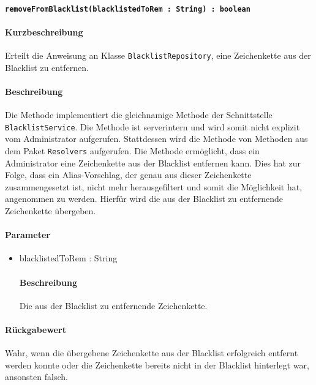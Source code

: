 \paragraph{\texttt{removeFromBlacklist(blacklistedToRem : String) : boolean}}%
\paragraph*{Kurzbeschreibung}
Erteilt die Anweisung an Klasse \texttt{BlacklistRepository}, eine Zeichenkette aus der Blacklist zu entfernen.
\paragraph*{Beschreibung}
Die Methode implementiert die gleichnamige Methode der Schnittstelle \texttt{BlacklistService}.
Die Methode ist serverintern und wird somit nicht explizit vom Administrator aufgerufen.
Stattdessen wird die Methode von Methoden aus dem Paket \texttt{Resolvers} aufgerufen.
Die Methode ermöglicht, dass ein Administrator eine Zeichenkette aus der Blacklist entfernen kann.
Dies hat zur Folge, dass ein Alias-Vorschlag, der genau aus dieser Zeichenkette zusammengesetzt ist, nicht mehr herausgefiltert und somit die Möglichkeit hat, angenommen zu werden.
Hierfür wird die aus der Blacklist zu entfernende Zeichenkette übergeben.
\paragraph*{Parameter}
\begin{itemize}
    \item blacklistedToRem : String
    		\paragraph*{Beschreibung}
    		Die aus der Blacklist zu entfernende Zeichenkette.
\end{itemize}
\paragraph*{Rückgabewert}
Wahr, wenn die übergebene Zeichenkette aus der Blacklist erfolgreich entfernt werden konnte oder die Zeichenkette bereits nicht in der Blacklist hinterlegt war, ansonsten falsch.
